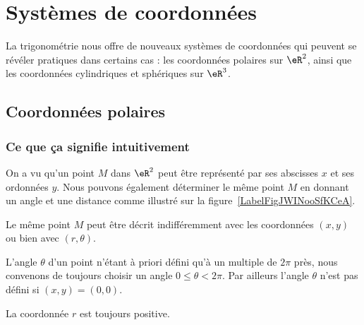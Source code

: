 \section{Systèmes de coordonnées}
\label{SECooWTPRooZbOSzO}

La trigonométrie nous offre de nouveaux systèmes de coordonnées qui peuvent se révéler pratiques dans certains cas : les coordonnées polaires sur \( \eR^2\), ainsi que les coordonnées cylindriques et sphériques sur \( \eR^3\).

\subsection{Coordonnées polaires}

\subsubsection{Ce que ça signifie intuitivement}

On a vu qu'un point $M$ dans $\eR^2$ peut être représenté par ses abscisses $x$ et ses ordonnées $y$. Nous pouvons également déterminer le même point $M$ en donnant un angle et une distance comme illustré sur la figure~\ref{LabelFigJWINooSfKCeA}.
\newcommand{\CaptionFigJWINooSfKCeA}{Un point en coordonnées polaires est donné par sa distance à l'origine et par l'angle qu'il fait avec l'horizontale.}



Le même point $M$ peut être décrit indifféremment avec les coordonnées $(x,y)$ ou bien avec $(r,\theta)$.

\begin{remark}
	L'angle $\theta$ d'un point n'étant à priori défini qu'à un multiple de $2\pi$ près, nous convenons de toujours choisir un angle $0\leq\theta<2\pi$. Par ailleurs l'angle $\theta$ n'est pas défini si $(x,y)=(0,0)$.

	La coordonnée $r$ est toujours positive.
\end{remark}

